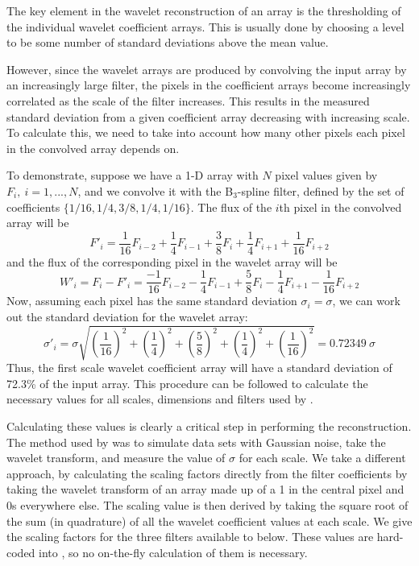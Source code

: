 \label{app-scaling}

The key element in the wavelet reconstruction of an array is the
thresholding of the individual wavelet coefficient arrays. This is
usually done by choosing a level to be some number of standard
deviations above the mean value.

However, since the wavelet arrays are produced by convolving the input
array by an increasingly large filter, the pixels in the coefficient
arrays become increasingly correlated as the scale of the filter
increases. This results in the measured standard deviation from a
given coefficient array decreasing with increasing scale. To calculate
this, we need to take into account how many other pixels each pixel in
the convolved array depends on.

To demonstrate, suppose we have a 1-D array with $N$ pixel values
given by $F_i,\ i=1,...,N$, and we convolve it with the B$_3$-spline
filter, defined by the set of coefficients
$\{1/16,1/4,3/8,1/4,1/16\}$. The flux of the $i$th pixel in the
convolved array will be
\[
F'_i = \frac{1}{16}F_{i-2} + \frac{1}{4}F_{i-1} + \frac{3}{8}F_{i}
+ \frac{1}{4}F_{i+1} + \frac{1}{16}F_{i+2}
\]
and the flux of the corresponding pixel in the wavelet array will be 
\[
W'_i = F_i - F'_i = \frac{-1}{16}F_{i-2} - \frac{1}{4}F_{i-1} 
+ \frac{5}{8}F_{i} - \frac{1}{4}F_{i+1} - \frac{1}{16}F_{i+2}
\]
Now, assuming each pixel has the same standard deviation
$\sigma_i=\sigma$, we can work out the standard deviation for the
wavelet array:
\[
\sigma'_i = \sigma \sqrt{\left(\frac{1}{16}\right)^2 
  + \left(\frac{1}{4}\right)^2 + \left(\frac{5}{8}\right)^2 
  + \left(\frac{1}{4}\right)^2 + \left(\frac{1}{16}\right)^2}
          = 0.72349\ \sigma
\]
Thus, the first scale wavelet coefficient array will have a standard
deviation of 72.3\% of the input array. This procedure can be followed
to calculate the necessary values for all scales, dimensions and
filters used by \duchamp.

Calculating these values is clearly a critical step in performing the
reconstruction. The method used by \citet{starck02:book} was to
simulate data sets with Gaussian noise, take the wavelet transform,
and measure the value of $\sigma$ for each scale. We take a different
approach, by calculating the scaling factors directly from the filter
coefficients by taking the wavelet transform of an array made up of a
1 in the central pixel and 0s everywhere else. The scaling value is
then derived by taking the square root of the sum (in quadrature) of
all the wavelet coefficient values at each scale. We give the scaling
factors for the three filters available to \duchamp below. These
values are hard-coded into \duchamp, so no on-the-fly calculation of
them is necessary.

